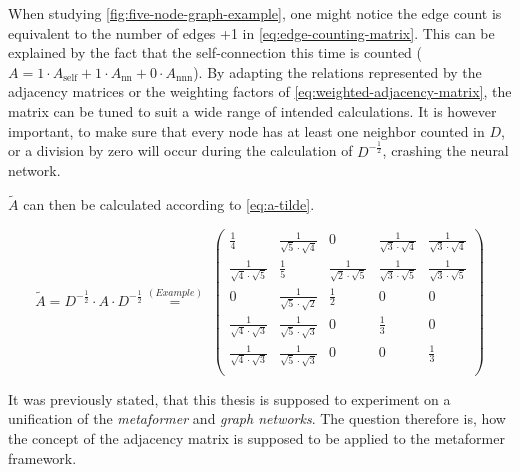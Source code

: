When studying \autoref{fig:five-node-graph-example}, one might notice the edge count is equivalent to the number of edges +1 in \autoref{eq:edge-counting-matrix}.
This can be explained by the fact that the self-connection this time is counted ($A = 1 \cdot A_\mathrm{self} +1 \cdot  A_\mathrm{nn}+0 \cdot  A_\mathrm{nnn}$).
By adapting the relations represented by the adjacency matrices or the weighting factors of \autoref{eq:weighted-adjacency-matrix}, the matrix can be tuned to suit a wide range of intended calculations. 
It is however important, to make sure that every node has at least one neighbor counted in $D$, or a division by zero will occur during the calculation of $D^{-\frac{1}{2}}$, crashing the neural network.

$\tilde{A}$ can then be calculated according to \autoref{eq:a-tilde}. 

\begin{equation}
    \label{eq:a-tilde}
    \tilde{A} = D^{-\frac{1}{2}} \cdot A \cdot  D^{-\frac{1}{2}} \stackrel{(Example)}{=} \,\,\left(\begin{matrix}
        \frac{1}{4} & \frac{1}{\sqrt{5}\cdot\sqrt{4}} & 0 & \frac{1}{\sqrt{3}\cdot\sqrt{4}} & \frac{1}{\sqrt{3}\cdot\sqrt{4}} \\
        \frac{1}{\sqrt{4}\cdot\sqrt{5}} & \frac{1}{5} & \frac{1}{\sqrt{2}\cdot\sqrt{5}} & \frac{1}{\sqrt{3}\cdot\sqrt{5}} & \frac{1}{\sqrt{3}\cdot\sqrt{5}} \\
        0 & \frac{1}{\sqrt{5}\cdot\sqrt{2}} & \frac{1}{2} & 0 & 0 \\
        \frac{1}{\sqrt{4}\cdot\sqrt{3}} & \frac{1}{\sqrt{5}\cdot\sqrt{3}} & 0 & \frac{1}{3} & 0 \\
        \frac{1}{\sqrt{4}\cdot\sqrt{3}} & \frac{1}{\sqrt{5}\cdot\sqrt{3}} & 0 & 0 & \frac{1}{3} \\
    \end{matrix}\right)
\end{equation}

It was previously stated, that this thesis is supposed to experiment on a unification of the \emph{metaformer} \cite{metaformerPaper} and \emph{graph networks}.
The question therefore is, how the concept of the adjacency matrix is supposed to be applied to the metaformer framework.\\

